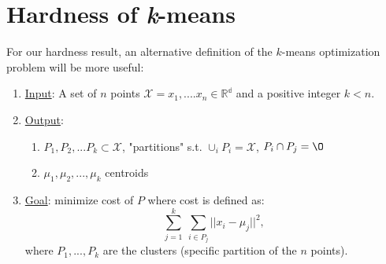\section{Hardness of \emph{k}-means}

For our hardness result, an alternative definition of the $k$-means
optimization problem will be more useful: 
\begin{enumerate}
\item \underline{Input}: A set of $n$ points $\mathcal{X} =
  x_1,....x_n \in \mathbb{R^d}$ and a positive integer $k<n$. 
\item \underline{Output}: 
\begin{enumerate}
\item $P_1,P_2,...P_k  \subset  \mathcal{X}$, "partitions"
  s.t. $\cup_i P_i = \mathcal{X}$, $P_i \cap P_j = \O$
\item $\mu_1,\mu_2,...,\mu_k$ centroids
\end{enumerate}
\item \underline{Goal}: minimize cost of $P$ where cost is defined
  as:
  \[\sum_{j=1}^{k} \ \sum_{i\in P_j} || x_i - \mu_j || ^2,\]
  where $P_1,..., P_k$ are the clusters (specific partition of the $n$
  points).
\end{enumerate}

